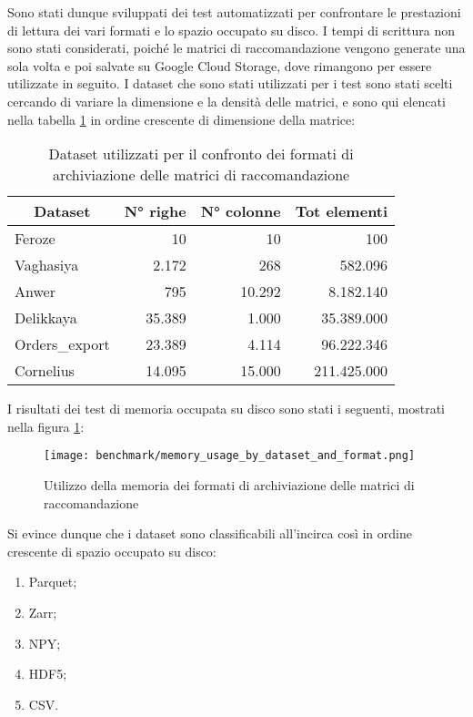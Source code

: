 Sono stati dunque sviluppati dei test automatizzati per confrontare le prestazioni di lettura dei vari formati e lo spazio occupato su disco. I tempi di scrittura non sono stati considerati, poiché le matrici di raccomandazione vengono generate una sola volta e poi salvate su Google Cloud Storage, dove rimangono per essere utilizzate in seguito. I dataset che sono stati utilizzati per i test sono stati scelti cercando di variare la dimensione e la densità delle matrici, e sono qui elencati nella tabella \ref{tab:dataset-matrici} in ordine crescente di dimensione della matrice:
\begin{table}[h]
    \centering
    \begin{tabular}{|l|r|r|r|}
        \hline
        \multicolumn{1}{|c|}{\textbf{Dataset}} & \multicolumn{1}{|c|}{\textbf{N° righe}} & \multicolumn{1}{|c|}{\textbf{N° colonne}} & \multicolumn{1}{|c|}{\textbf{Tot elementi}} \\
        \hline
        Feroze & 10 & 10 & 100 \\
        Vaghasiya & 2.172 & 268 & 582.096 \\
        Anwer & 795 & 10.292 & 8.182.140 \\
        Delikkaya & 35.389 & 1.000 & 35.389.000 \\
        Orders\_export & 23.389 & 4.114 & 96.222.346 \\
        Cornelius & 14.095 & 15.000 & 211.425.000 \\
        \hline
    \end{tabular}
    \caption{Dataset utilizzati per il confronto dei formati di archiviazione delle matrici di raccomandazione}
    \label{tab:dataset-matrici}
\end{table}

I risultati dei test di memoria occupata su disco sono stati i seguenti, mostrati nella figura \ref{fig:memory-usage-recommendation-matrices}:

\newpage

\begin{figure}[!h]
    \centering
    \texttt{[image: benchmark/memory\_usage\_by\_dataset\_and\_format.png]}
    \caption{Utilizzo della memoria dei formati di archiviazione delle matrici di raccomandazione}
    \label{fig:memory-usage-recommendation-matrices}
\end{figure}

Si evince dunque che i dataset sono classificabili all'incirca così in ordine crescente di spazio occupato su disco:
\begin{enumerate}
    \item Parquet;
    \item Zarr;
    \item NPY;
    \item HDF5;
    \item CSV.
\end{enumerate}

